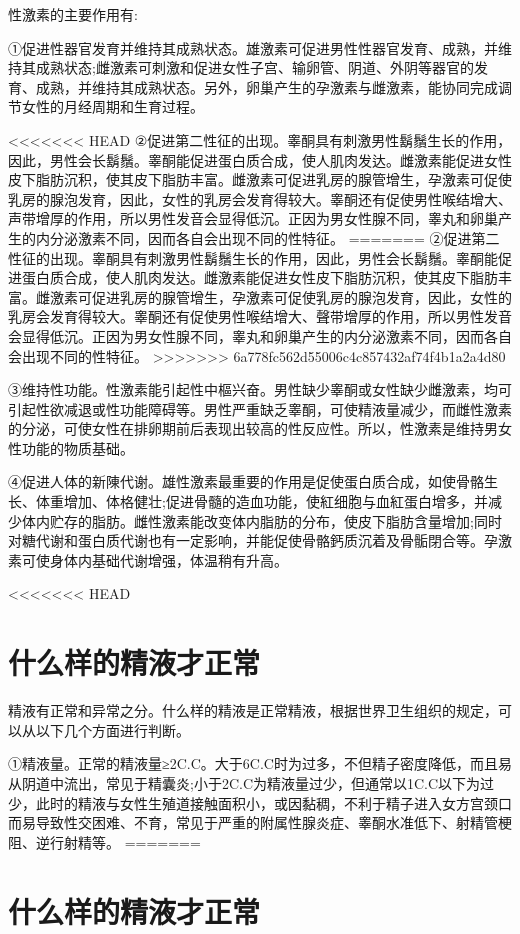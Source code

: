 \documentclass[12pt,UTF8]{ctexbook}
\begin{document}
性激素的主要作用有:

①促进性器官发育并维持其成熟状态。雄激素可促进男性性器官发育、成熟，并维持其成熟状态;雌激素可刺激和促进女性子宫、输卵管、阴道、外阴等器官的发育、成熟，并维持其成熟状态。另外，卵巢产生的孕激素与雌激素，能协同完成调节女性的月经周期和生育过程。

<<<<<<< HEAD
②促进第二性征的出现。睾酮具有刺激男性鬍鬚生长的作用，因此，男性会长鬍鬚。睾酮能促进蛋白质合成，使人肌肉发达。雌激素能促进女性皮下脂肪沉积，使其皮下脂肪丰富。雌激素可促进乳房的腺管增生，孕激素可促使乳房的腺泡发育，因此，女性的乳房会发育得较大。睾酮还有促使男性喉结增大、声带增厚的作用，所以男性发音会显得低沉。正因为男女性腺不同，睾丸和卵巢产生的内分泌激素不同，因而各自会出现不同的性特征。
=======
②促进第二性征的出现。睾酮具有刺激男性鬍鬚生长的作用，因此，男性会长鬍鬚。睾酮能促进蛋白质合成，使人肌肉发达。雌激素能促进女性皮下脂肪沉积，使其皮下脂肪丰富。雌激素可促进乳房的腺管增生，孕激素可促使乳房的腺泡发育，因此，女性的乳房会发育得较大。睾酮还有促使男性喉结增大、聲带增厚的作用，所以男性发音会显得低沉。正因为男女性腺不同，睾丸和卵巢产生的内分泌激素不同，因而各自会出现不同的性特征。
>>>>>>> 6a778fc562d55006c4c857432af74f4b1a2a4d80

③维持性功能。性激素能引起性中樞兴奋。男性缺少睾酮或女性缺少雌激素，均可引起性欲减退或性功能障碍等。男性严重缺乏睾酮，可使精液量减少，而雌性激素的分泌，可使女性在排卵期前后表现出较高的性反应性。所以，性激素是维持男女性功能的物质基础。

④促进人体的新陳代谢。雄性激素最重要的作用是促使蛋白质合成，如使骨骼生长、体重增加、体格健壮;促进骨髓的造血功能，使紅细胞与血紅蛋白增多，并减少体内贮存的脂肪。雌性激素能改变体内脂肪的分布，使皮下脂肪含量增加;同时对糖代谢和蛋白质代谢也有一定影响，并能促使骨骼鈣质沉着及骨骺閉合等。孕激素可使身体内基础代谢增强，体温稍有升高。

<<<<<<< HEAD
\section{什么样的精液才正常}

精液有正常和异常之分。什么样的精液是正常精液，根据世界卫生组织的规定，可以从以下几个方面进行判断。

①精液量。正常的精液量≥2C.C。大于6C.C时为过多，不但精子密度降低，而且易从阴道中流出，常见于精囊炎;小于2C.C为精液量过少，但通常以1C.C以下为过少，此时的精液与女性生殖道接触面积小，或因黏稠，不利于精子进入女方宫颈口而易导致性交困难、不育，常见于严重的附属性腺炎症、睾酮水准低下、射精管梗阻、逆行射精等。
=======
\section{什么样的精液才正常}
\end{document}
